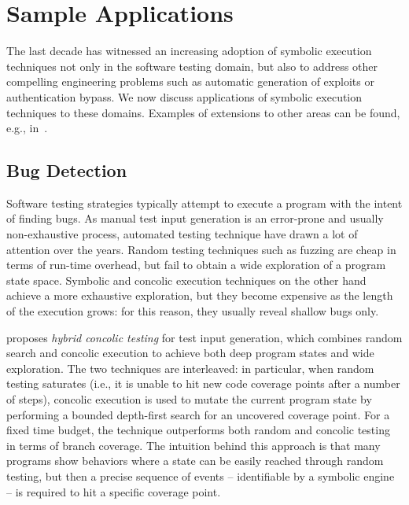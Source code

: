 
\section{Sample Applications}
\label{se:applications}

The last decade has witnessed an increasing adoption of symbolic execution techniques not only in the software testing domain, but also to address other compelling engineering problems such as automatic generation of exploits or authentication bypass. We now discuss  applications of symbolic execution techniques to these domains. Examples of extensions to other areas can be found, e.g., in~\cite{CGK-ICSE11}.


\subsection{Bug Detection}
\label{ss:bug-detection}

Software testing strategies typically attempt to execute a program with the intent of finding bugs. As manual test input generation is an error-prone and usually non-exhaustive process, automated testing technique have drawn a lot of attention over the years. Random testing techniques such as fuzzing are cheap in terms of run-time overhead, but fail to obtain a wide exploration of a program state space. Symbolic and concolic execution techniques on the other hand achieve a more exhaustive exploration, but they become expensive as the length of the execution grows: for this reason, they usually reveal shallow bugs only.

\cite{RK-ICSE07} proposes {\em hybrid concolic testing} for test input generation, which combines random search and concolic execution to achieve both deep program states and wide exploration. The two techniques are interleaved: in particular, when random testing saturates (i.e., it is unable to hit new code coverage points after a number of steps), concolic execution is used to mutate the current program state by performing a bounded depth-first search for an uncovered coverage point. For a fixed time budget, the technique outperforms both random and concolic testing in terms of branch coverage. The intuition behind this approach is that many programs show behaviors where a state can be easily reached through random testing, but then a precise sequence of events -- identifiable by a symbolic engine -- is required to hit a specific coverage point.

